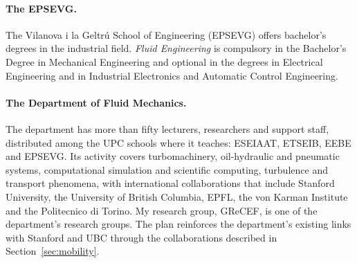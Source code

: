 \documentclass[11pt]{article}
\begin{document}
\paragraph{The EPSEVG.} The Vilanova i la Geltr\'u School of Engineering (EPSEVG) offers
bachelor's degrees in the industrial field. \emph{Fluid Engineering} is compulsory in the
Bachelor's Degree in Mechanical Engineering and optional in the degrees in Electrical
Engineering and in Industrial Electronics and Automatic Control Engineering.

\paragraph{The Department of Fluid Mechanics.} The department has more than fifty
lecturers, researchers and support staff, distributed among the UPC schools where it
teaches: ESEIAAT, ETSEIB, EEBE and EPSEVG. Its activity covers turbomachinery,
oil-hydraulic and pneumatic systems, computational simulation and scientific computing,
turbulence and transport phenomena, with international collaborations that include
Stanford University, the University of British Columbia, EPFL, the von Karman Institute and
the Politecnico di Torino. My research group, GReCEF, is one of the department's research
groups. The plan reinforces the department's existing links with Stanford and UBC through
the collaborations described in Section~\ref{sec:mobility}.
\end{document}
